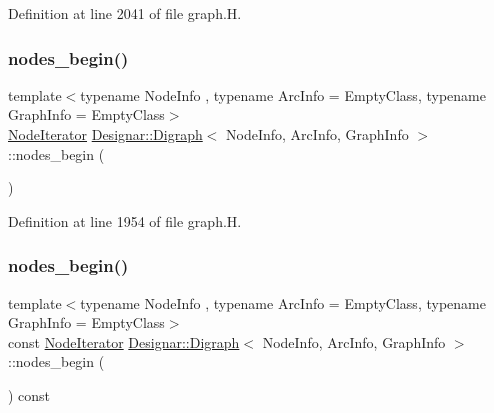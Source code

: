 Definition at line 2041 of file graph.\+H.

\mbox{\label{class_designar_1_1_digraph_af2a2ede7d4af852e67705f2c2bf394d2}} 
\subsubsection{\texorpdfstring{nodes\+\_\+begin()}{nodes\_begin()}\hspace{0.1cm}{\footnotesize\ttfamily [1/2]}}
{\footnotesize\ttfamily template$<$typename Node\+Info , typename Arc\+Info  = Empty\+Class, typename Graph\+Info  = Empty\+Class$>$ \\
\hyperlink{class_designar_1_1_digraph_1_1_node_iterator}{Node\+Iterator} \hyperlink{class_designar_1_1_digraph}{Designar\+::\+Digraph}$<$ Node\+Info, Arc\+Info, Graph\+Info $>$\+::nodes\+\_\+begin (\begin{DoxyParamCaption}{ }\end{DoxyParamCaption})\hspace{0.3cm}{\ttfamily [inline]}}



Definition at line 1954 of file graph.\+H.

\mbox{\label{class_designar_1_1_digraph_a6fcecdd41bdd4af1a0e1a7a5a3e8a3eb}} 
\subsubsection{\texorpdfstring{nodes\+\_\+begin()}{nodes\_begin()}\hspace{0.1cm}{\footnotesize\ttfamily [2/2]}}
{\footnotesize\ttfamily template$<$typename Node\+Info , typename Arc\+Info  = Empty\+Class, typename Graph\+Info  = Empty\+Class$>$ \\
const \hyperlink{class_designar_1_1_digraph_1_1_node_iterator}{Node\+Iterator} \hyperlink{class_designar_1_1_digraph}{Designar\+::\+Digraph}$<$ Node\+Info, Arc\+Info, Graph\+Info $>$\+::nodes\+\_\+begin (\begin{DoxyParamCaption}{ }\end{DoxyParamCaption}) const\hspace{0.3cm}{\ttfamily [inline]}}



